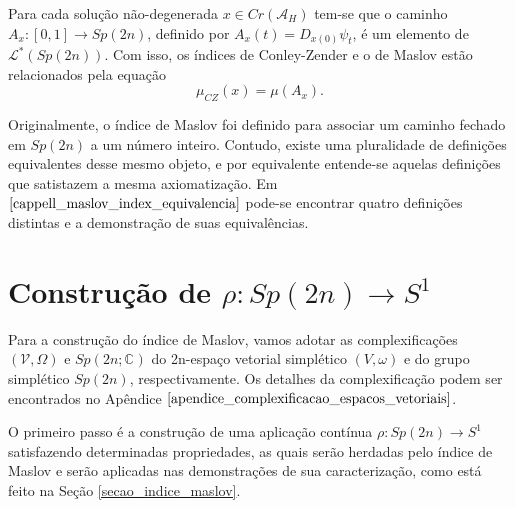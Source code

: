 \documentclass[12pt]{book}
\newcommand{\caminhosespeciais}[1]{\mathcal{L}^{*}(#1)}
\newcommand{\circulo}{S^{1}}
\newcommand{\complexificado}[1]{\mathcal{#1}}
\newcommand{\complexo}[1]{\mathbb{C}^{#1}}
\newcommand{\funcionalH}{\mathcal{A}_{H}}
\newcommand{\gruposimpletico}[1]{Sp(#1)}
\newcommand{\gruposimpleticocomplexo}[1]{Sp(#1; \complexo{})}
\newcommand{\iconley}[1]{\iconleyabrev(#1)}
\newcommand{\iconleyabrev}{\mu_{CZ}}
\newcommand{\intervalo}{[0,1]}
\newcommand{\pontoscriticos}[1]{\textit{Cr}(#1)}
\begin{document}
	Para cada solução não-degenerada $x \in \pontoscriticos{\funcionalH}$ tem-se que o caminho $A_{x}:\intervalo \to \gruposimpletico{2n}$, definido por $A_{x}(t) = D_{x(0)}\psi_{t} $, é um elemento de $\caminhosespeciais{\gruposimpletico{2n}}$. Com isso, os índices de Conley-Zender e o de Maslov estão relacionados pela equação
	$$
	\iconley{x} = \mu(A_{x}).
	$$
	
	Originalmente, o índice de Maslov foi definido para associar um caminho fechado em $\gruposimpletico{2n} $ a um número inteiro. Contudo, existe uma pluralidade de definições equivalentes desse mesmo objeto, e por equivalente entende-se aquelas definições que satistazem a mesma axiomatização. Em $\cite{cappell_maslov_index_equivalencia}$ pode-se encontrar quatro definições distintas e a demonstração de suas equivalências.
	
	
	\section{Construção de $\rho: \gruposimpletico{2n} \to \circulo$}
	Para a construção do índice de Maslov, vamos adotar as complexificações $(\complexificado{V}, \Omega) $ e $\gruposimpleticocomplexo{2n}$ do 2n-espaço vetorial simplético $(V, \omega)$ e do grupo simplético $\gruposimpletico{2n}$, respectivamente. Os detalhes da complexificação podem ser encontrados no Apêndice $\ref{apendice_complexificacao_espacos_vetoriais}$. 
	
	O primeiro passo é a construção de uma aplicação contínua $\rho: \gruposimpletico{2n}\to \circulo$ satisfazendo determinadas propriedades, as quais serão herdadas pelo índice de Maslov e serão aplicadas nas demonstrações de sua caracterização, como está feito na Seção \ref{secao_indice_maslov}.
	
\end{document}
